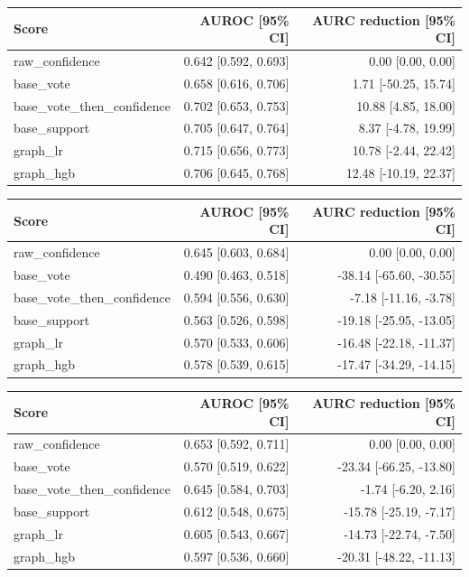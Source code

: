 \begin{tabular}{lrr}
\hline
Score & AUROC [95\% CI] & AURC reduction [95\% CI] \\
\hline
raw\_confidence & 0.642 [0.592, 0.693] & 0.00 [0.00, 0.00] \\
base\_vote & 0.658 [0.616, 0.706] & 1.71 [-50.25, 15.74] \\
base\_vote\_then\_confidence & 0.702 [0.653, 0.753] & 10.88 [4.85, 18.00] \\
base\_support & 0.705 [0.647, 0.764] & 8.37 [-4.78, 19.99] \\
graph\_lr & 0.715 [0.656, 0.773] & 10.78 [-2.44, 22.42] \\
graph\_hgb & 0.706 [0.645, 0.768] & 12.48 [-10.19, 22.37] \\
\hline
\end{tabular}

\begin{tabular}{lrr}
\hline
Score & AUROC [95\% CI] & AURC reduction [95\% CI] \\
\hline
raw\_confidence & 0.645 [0.603, 0.684] & 0.00 [0.00, 0.00] \\
base\_vote & 0.490 [0.463, 0.518] & -38.14 [-65.60, -30.55] \\
base\_vote\_then\_confidence & 0.594 [0.556, 0.630] & -7.18 [-11.16, -3.78] \\
base\_support & 0.563 [0.526, 0.598] & -19.18 [-25.95, -13.05] \\
graph\_lr & 0.570 [0.533, 0.606] & -16.48 [-22.18, -11.37] \\
graph\_hgb & 0.578 [0.539, 0.615] & -17.47 [-34.29, -14.15] \\
\hline
\end{tabular}

\begin{tabular}{lrr}
\hline
Score & AUROC [95\% CI] & AURC reduction [95\% CI] \\
\hline
raw\_confidence & 0.653 [0.592, 0.711] & 0.00 [0.00, 0.00] \\
base\_vote & 0.570 [0.519, 0.622] & -23.34 [-66.25, -13.80] \\
base\_vote\_then\_confidence & 0.645 [0.584, 0.703] & -1.74 [-6.20, 2.16] \\
base\_support & 0.612 [0.548, 0.675] & -15.78 [-25.19, -7.17] \\
graph\_lr & 0.605 [0.543, 0.667] & -14.73 [-22.74, -7.50] \\
graph\_hgb & 0.597 [0.536, 0.660] & -20.31 [-48.22, -11.13] \\
\hline
\end{tabular}

